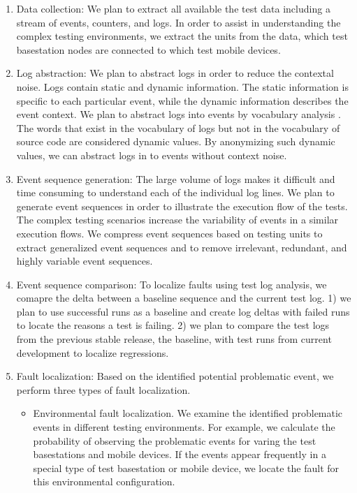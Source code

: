 \begin{enumerate}

\item Data collection: We plan to extract all available the test data including a stream of events, counters, and logs. In order to assist in understanding the complex testing environments, we extract the units from the data, \ie which test basestation nodes are connected to which test mobile devices.

\item Log abstraction: We plan to abstract logs in order to reduce the contextal noise. Logs contain static and dynamic information. The static information is specific to each particular event, while the dynamic information describes the event context. We plan to abstract logs into events by vocabulary analysis . The words that exist in the vocabulary of logs but not in the vocabulary of source code are considered dynamic values. By anonymizing such dynamic values, we can abstract logs in to events without context noise. 

\item Event sequence generation: The large volume of logs makes it difficult
and time consuming to understand each of the individual log lines. We plan to
generate event sequences in order to illustrate the execution flow of the
tests. The complex testing scenarios increase the variability of events in a
similar execution flows. We compress event sequences based on testing units to
extract generalized event sequences and to remove irrelevant, redundant, and
highly variable event sequences.

\item Event sequence comparison: To localize faults using test log analysis, we comapre the delta between a baseline sequence and the current test log. 1) we plan to use successful runs as a baseline and create log deltas with failed runs to locate the reasons a test is failing. 2) we plan to compare the test logs from the previous stable release, the baseline, with test runs from current development to localize regressions.

\item Fault localization: Based on the identified potential problematic event, we perform three types of fault localization. 
	\begin{itemize}
		\item Environmental fault localization. We examine the identified problematic events in different testing environments. For example, we calculate the probability of observing the problematic events for varing the test basestations and mobile devices. If the events appear frequently in a special type of test basestation or mobile device, we locate the fault for this environmental configuration.
		

\end{itemize}
\end{enumerate}

